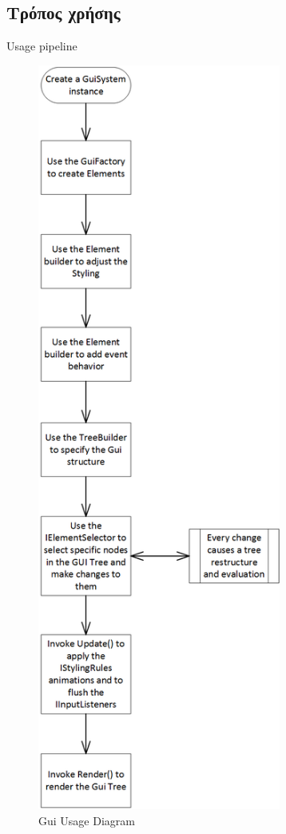 \subsection{Τρόπος χρήσης}
Usage pipeline
\begin{figure}[h!]
	\centering
	\includegraphics[width=80mm]{Images/gui_usage}
	\caption{Gui Usage Diagram}
	\label{fig:gui_usage}
\end{figure}

